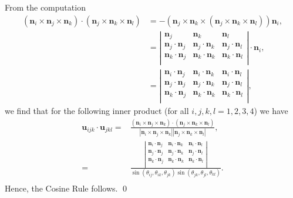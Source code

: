 \documentclass[fleqn,11pt,twoside]{article}
\makeatletter
\renewenvironment{proof}[1][\proofname]{\par
  \normalfont
  \topsep6\p@\@plus6\p@ \trivlist
  \item[\hskip\labelsep\textbf{%
    #1\@addpunct{.}}]\ignorespaces
}{%
  \qed\endtrivlist
}
\theoremstyle{definition}
\makeatother
\begin{document}
\begin{proof}
From the computation
\begin{equation}
\begin{split}
(\textbf{n}_i\times\textbf{n}_j\times\textbf{n}_k)\cdot(\textbf{n}_j\times\textbf{n}_k\times\textbf{n}_l)&=-(\mathbf{n}_j\times\mathbf{n}_k\times(\mathbf{n}_j\times\mathbf{n}_k\times\mathbf{n}_l))\mathbf{n}_i,\\
&=\left|\begin{array}{ccc}
\textbf{n}_j & \textbf{n}_k & \textbf{n}_l \\
\textbf{n}_j\cdot\textbf{n}_j & \textbf{n}_j\cdot\textbf{n}_k & \textbf{n}_j\cdot\textbf{n}_l \\
\textbf{n}_k\cdot\textbf{n}_j & \textbf{n}_k\cdot\textbf{n}_k & \textbf{n}_k\cdot\textbf{n}_l \\
\end{array}\right|\cdot\mathbf{n}_i,\\
&=\left|\begin{array}{ccc}
\textbf{n}_i\cdot\textbf{n}_j & \textbf{n}_i\cdot\textbf{n}_k & \textbf{n}_i\cdot\textbf{n}_l \\
\textbf{n}_j\cdot\textbf{n}_j & \textbf{n}_j\cdot\textbf{n}_k & \textbf{n}_j\cdot\textbf{n}_l \\
\textbf{n}_k\cdot\textbf{n}_j & \textbf{n}_k\cdot\textbf{n}_k & \textbf{n}_k\cdot\textbf{n}_l \\
\end{array}\right|,
\end{split}
\end{equation}
we find that for the following inner product (for all $i,j,k,l=1,2,3,4$) we have
\begin{equation}
\begin{split}
\textbf{u}_{ijk}\cdot\textbf{u}_{jkl}=&\frac
{(\textbf{n}_i\times\textbf{n}_j\times\textbf{n}_k)\cdot(\textbf{n}_j\times\textbf{n}_k\times\textbf{n}_l)}
{\left|\textbf{n}_i\times\textbf{n}_j\times\textbf{n}_k\right|\left|\textbf{n}_j\times\textbf{n}_k\times\textbf{n}_l\right|},\\
=&\frac{\left|\begin{array}{ccc}
\textbf{n}_i\cdot\textbf{n}_j & \textbf{n}_i\cdot\textbf{n}_k & \textbf{n}_i\cdot\textbf{n}_l \\
\textbf{n}_j\cdot\textbf{n}_j & \textbf{n}_j\cdot\textbf{n}_k & \textbf{n}_j\cdot\textbf{n}_l \\
\textbf{n}_k\cdot\textbf{n}_j & \textbf{n}_k\cdot\textbf{n}_k & \textbf{n}_k\cdot\textbf{n}_l \\
\end{array}\right|}
{\sin(\theta_{ij},\theta_{ik},\theta_{jk})\sin(\theta_{jk},\theta_{jl},\theta_{kl})}.\\
\end{split}
\end{equation}
Hence, the Cosine Rule follows.
\end{proof}
\end{document}
